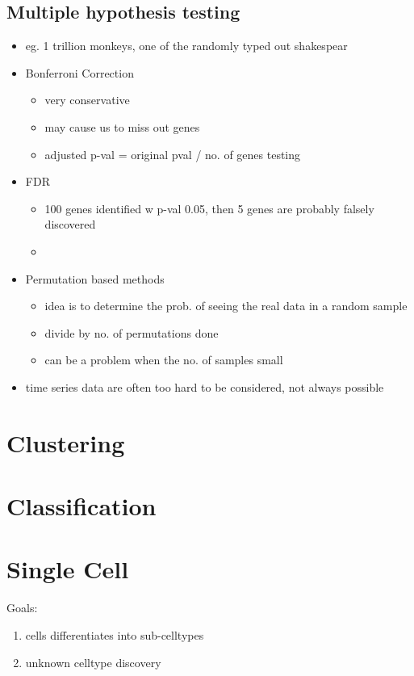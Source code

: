 \documentclass[font=12pt]{article}
\begin{document}
\subsection{Multiple hypothesis testing}
\begin{itemize}
	\item eg. 1 trillion monkeys, one of the randomly typed out shakespear
	\item Bonferroni Correction
	\begin{itemize}
		\item very conservative
		\item may cause us to miss out genes
		\item adjusted p-val = original pval / no. of genes testing
	\end{itemize}
	\item FDR
	\begin{itemize}
		\item 100 genes identified w p-val 0.05, then 5 genes are probably falsely discovered
		\item {}
	\end{itemize}
	\item Permutation based methods
	\begin{itemize}
		\item idea is to determine the prob. of seeing the real data in a random sample
		\item divide by no. of permutations done
		\item can be a problem when the no. of samples small
	\end{itemize}
	\item time series data are often too hard to be considered, not always possible
\end{itemize}
\newpage
\section{Clustering}

\newpage
\section{Classification}

\newpage
\section{Single Cell}
Goals:
\begin{enumerate}
	\item cells differentiates into sub-celltypes
	\item unknown celltype discovery
\end{enumerate}
\end{document}
